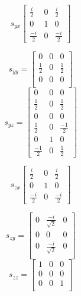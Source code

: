 \documentclass[12pt]{article}
\begin{document}
\begin{equation}
s_{yx}
\begin{bmatrix}
\frac{i}{2} & 0  & \frac{i}{2} \\ 
0           & 1 & 0\\
\frac{-i}{2} & 0  & \frac{-i}{2} 
\end{bmatrix}
\end{equation}

\begin{equation}
s_{yy} = 
\begin{bmatrix}
0           & 0 & 0\\
\frac{1}{2} & 0  & \frac{1}{2} \\ 
0           & 0 & 0\\
\end{bmatrix}
\end{equation}
\begin{equation}
s_{yz} = 
\begin{bmatrix}
0           & 0 & 0\\
\frac{1}{2} & 0  & \frac{1}{2} \\ 
0           & 0 & 0\\


\frac{1}{2}  & 0  & \frac{-1}{2} \\ 
0            & 1  & 0\\
\frac{-1}{2} & 0  & \frac{1}{2} 
\end{bmatrix}
\end{equation}

\begin{equation}
s_{zx}
\begin{bmatrix}
\frac{i}{2} & 0  & \frac{i}{2} \\ 
0           & 1 & 0\\
\frac{-i}{2} & 0  & \frac{-i}{2} 
\end{bmatrix}
\end{equation}

\begin{equation}
s_{zy} = 
\begin{bmatrix}
0     &  \frac{-i}{\sqrt{2}} & 0 \\ 
0     & 0                    & 0 \\
0     &  \frac{-i}{\sqrt{2}} & 0 \\
\end{bmatrix}
\end{equation}
\begin{equation}
s_{zz} = 
\begin{bmatrix}
1     & 0 & 0\\
0     & 0 & 0 \\ 
0     & 0 & 1\\
\end{bmatrix}
\end{equation}
\end{document}
